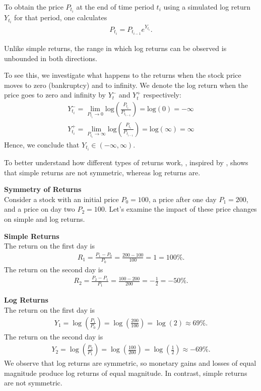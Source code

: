 To obtain the price $P_{t_i}$ at the end of time period $t_i$ using a simulated log return $Y_{t_i}$ for that period, one calculates 
\begin{align*}
    P_{t_i} = P_{t_{i-1}} e^{Y_{t_i}}.
\end{align*}

Unlike simple returns, the range in which log returns can be observed is unbounded in both directions. 
\begin{example}
    To see this, we investigate what happens to the returns when the stock price moves to zero (bankruptcy) and to infinity. We denote the log return when the price goes to zero and infinity by $Y_t^-$ and $Y_t^+$ respectively:   
    \begin{align*}
        Y_{t_i}^- = \lim_{P_{t_i} \to 0} \mathrm{log} \left( \frac{P_{t_i}}{P_{t_{i-1}}} \right) = \mathrm{log}(0) = -\infty \\
        Y_{t_i}^+ = \lim_{P_{t_i} \to \infty} \mathrm{log} \left( \frac{P_{t_i}}{P_{t_{i-1}}} \right) = \mathrm{log}(\infty) = \infty    
    \end{align*}
    Hence, we conclude that $Y_{t_i} \in (-\infty,\infty)$. 
\end{example}

To better understand how different types of returns work, , inspired by , shows that simple returns are not symmetric, whereas log returns are. 
\begin{example}\label{ex:returnSymmetry}
    \textbf{Symmetry of Returns}\\
    Consider a stock with an initial price $P_0 = 100$, a price after one day $P_1 = 200$, and a price on day two $P_2 = 100$. Let's examine the impact of these price changes on simple and log returns.

    \textbf{Simple Returns}\\
    The return on the first day is
    \begin{align*}
        R_1 = \frac{P_1 - P_0}{P_0} = \frac{200 - 100}{100} = 1 = 100\%.
    \end{align*}
    The return on the second day is
    \begin{align*}
        R_2 = \frac{P_2 - P_1}{P_1} = \frac{100 - 200}{200} = -\frac{1}{2} = -50\%.
    \end{align*}    

    \textbf{Log Returns}\\
    The return on the first day is 
    \begin{align*}
        Y_1 = \log \left( \frac{P_1}{P_0} \right) = \log\left( \frac{200}{100} \right) = \log(2) \approx 69\%.
    \end{align*}
    The return on the second day is
    \begin{align*}
        Y_2 = \log \left( \frac{P_2}{P_1} \right) = \log \left( \frac{100}{200} \right) = \log\left( \frac{1}{2} \right) \approx -69\%.
    \end{align*}
    We observe that log returns are symmetric, so monetary gains and losses of equal magnitude produce log returns of equal magnitude. In contrast, simple returns are not symmetric.
\end{example}


